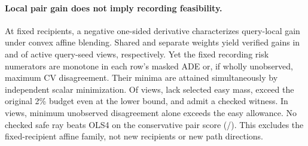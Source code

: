 \paragraph{Local pair gain does not imply recording feasibility.}
At fixed recipients, a negative one-sided derivative
characterizes query-local gain under convex affine blending.
Shared and separate weights yield verified gains in
\DirectionShared{} and \DirectionSeparate{} of \DirectionQueries{}
active query-seed views, respectively. Yet the fixed
recording risk numerators are monotone in each row's
masked ADE or, if wholly unobserved, maximum CV
disagreement. Their minima are attained simultaneously
by independent scalar minimization. Of \RiskViews{} views,
\RiskUndefined{} lack selected easy mass, \RiskExcluded{}
exceed the original 2\% budget even at the lower bound,
and \RiskFeasible{} admit a checked witness. In \RiskUnknown{}
views, minimum unobserved disagreement alone exceeds
the easy allowance. No checked safe ray beats OLS4 on the
conservative pair score (\RiskOlsPositive{}/\RiskFeasible{}).
This excludes the fixed-recipient affine family, not new
recipients or new path directions.
